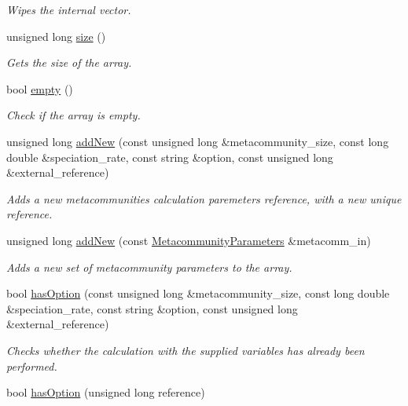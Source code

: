 \begin{DoxyCompactItemize}
\begin{DoxyCompactList}\small\item\em Wipes the internal vector. \end{DoxyCompactList}\item 
unsigned long \hyperlink{struct_metacommunities_array_aacd1795a5dcf8a8ba2690d29aa7f76df}{size} ()
\begin{DoxyCompactList}\small\item\em Gets the size of the array. \end{DoxyCompactList}\item 
bool \hyperlink{struct_metacommunities_array_aa39cf0eccb18b7e8d59d6a84d2dbbf90}{empty} ()
\begin{DoxyCompactList}\small\item\em Check if the array is empty. \end{DoxyCompactList}\item 
unsigned long \hyperlink{struct_metacommunities_array_a6ffe1001285cb2e6892f06d792b8ac06}{add\+New} (const unsigned long \&metacommunity\+\_\+size, const long double \&speciation\+\_\+rate, const string \&option, const unsigned long \&external\+\_\+reference)
\begin{DoxyCompactList}\small\item\em Adds a new metacommunities calculation paremeters reference, with a new unique reference. \end{DoxyCompactList}\item 
unsigned long \hyperlink{struct_metacommunities_array_a2969e9c50cb7cb9f9bb2f0a84abe89c4}{add\+New} (const \hyperlink{struct_metacommunity_parameters}{Metacommunity\+Parameters} \&metacomm\+\_\+in)
\begin{DoxyCompactList}\small\item\em Adds a new set of metacommunity parameters to the array. \end{DoxyCompactList}\item 
bool \hyperlink{struct_metacommunities_array_ad16c2b1df93accb5bffb5a6cfae7c0eb}{has\+Option} (const unsigned long \&metacommunity\+\_\+size, const long double \&speciation\+\_\+rate, const string \&option, const unsigned long \&external\+\_\+reference)
\begin{DoxyCompactList}\small\item\em Checks whether the calculation with the supplied variables has already been performed. \end{DoxyCompactList}\item 
bool \hyperlink{struct_metacommunities_array_a5b4f3e826d045aac2c7e09d8fb380876}{has\+Option} (unsigned long reference)

\end{DoxyCompactItemize}
